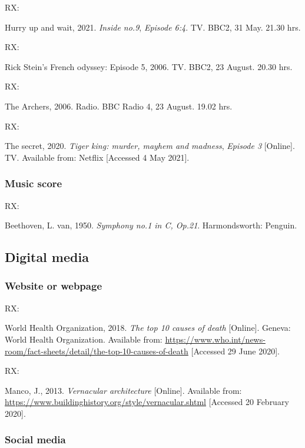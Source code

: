 RX: \cite{inn2021huw}

Hurry up and wait, 2021. \emph{Inside no.9}, \emph{Episode 6:4}. TV. BBC2, 31 May. 21.30 hrs.


RX: \cite{rsfo2006ep5}

Rick Stein's French odyssey: Episode 5, 2006. TV. BBC2, 23 August. 20.30 hrs.


RX: \cite{archers20060823}

The Archers, 2006. Radio. BBC Radio 4, 23 August. 19.02 hrs.


RX: \cite{tkmmm2020ts}

The secret, 2020. \emph{Tiger king: murder, mayhem and madness}, \emph{Episode 3} [Online]. TV. Available from: Netflix [Accessed 4 May 2021].



\subsubsection*{Music score}

RX: \cite{beethoven1950symph1}

Beethoven, L. van, 1950. \emph{Symphony no.1 in C, Op.21}. Harmondsworth: Penguin.



\subsection{Digital media}

\subsubsection*{Website or webpage}

RX: \cite{who2018ttc}

World Health Organization, 2018. \emph{The top 10 causes of death} [Online]. Geneva: World Health Organization. Available from: \url{https://www.who.int/news-room/fact-sheets/detail/the-top-10-causes-of-death} [Accessed 29 June 2020].


RX: \cite{manco2013va}

Manco, J., 2013. \emph{Vernacular architecture} [Online]. Available from: \url{https://www.buildinghistory.org/style/vernacular.shtml} [Accessed 20 February 2020].



\subsubsection*{Social media}


